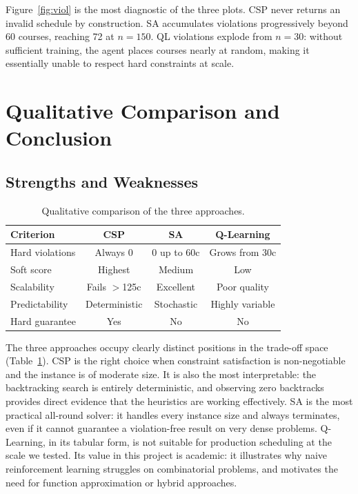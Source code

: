 \documentclass[letterpaper]{article}
\begin{document}
Figure~\ref{fig:viol} is the most diagnostic of the three plots. CSP never returns an invalid schedule by construction. SA accumulates violations progressively beyond 60 courses, reaching 72 at $n=150$. QL violations explode from $n=30$: without sufficient training, the agent places courses nearly at random, making it essentially unable to respect hard constraints at scale.

\section{Qualitative Comparison and Conclusion}

\subsection{Strengths and Weaknesses}

\begin{table}[h]
\centering
\caption{Qualitative comparison of the three approaches.}
\label{tab:comparison}
\small
\begin{tabular}{@{}lccc@{}}
\toprule
Criterion        & CSP            & SA             & Q-Learning \\
\midrule
Hard violations  & Always 0       & 0 up to 60c    & Grows from 30c \\
Soft score       & Highest        & Medium         & Low \\
Scalability      & Fails $>$125c  & Excellent      & Poor quality \\
Predictability   & Deterministic  & Stochastic     & Highly variable \\
Hard guarantee   & Yes            & No             & No \\
\bottomrule
\end{tabular}
\end{table}

The three approaches occupy clearly distinct positions in the trade-off space (Table~\ref{tab:comparison}). CSP is the right choice when constraint satisfaction is non-negotiable and the instance is of moderate size. It is also the most interpretable: the backtracking search is entirely deterministic, and observing zero backtracks provides direct evidence that the heuristics are working effectively. SA is the most practical all-round solver: it handles every instance size and always terminates, even if it cannot guarantee a violation-free result on very dense problems. Q-Learning, in its tabular form, is not suitable for production scheduling at the scale we tested. Its value in this project is academic: it illustrates why naive reinforcement learning struggles on combinatorial problems, and motivates the need for function approximation or hybrid approaches.
\end{document}
